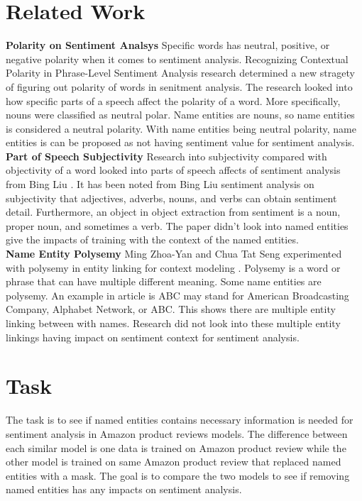 \documentclass[11pt,a4paper]{article}
\begin{document}
\section{Related Work}

\noindent \textbf{Polarity on Sentiment Analsys} Specific words has neutral, positive, or negative polarity when it comes to sentiment analysis. Recognizing Contextual Polarity in Phrase-Level Sentiment Analysis research determined a new stragety of figuring out polarity of words in senitment analysis. The research looked into how specific parts of a speech affect the polarity of a word. More specifically, nouns were classified as neutral polar. Name entities are nouns, so name entities is considered a neutral polarity. With name entities being neutral polarity, name entities is can be proposed as not having sentiment value for sentiment analysis. \\

\noindent \textbf{Part of Speech Subjectivity} Research into subjectivity compared with objectivity of a word looked into parts of speech affects of sentiment analysis from Bing Liu \cite{subject}. It has been noted from Bing Liu sentiment analysis on subjectivity that adjectives, adverbs, nouns, and verbs can obtain sentiment detail. Furthermore, an object in object extraction from sentiment is a noun, proper noun, and sometimes a verb. The paper didn't look into named entities give the impacts of training with the context of the named entities. \\

\noindent \textbf{Name Entity Polysemy} Ming Zhoa-Yan and Chua Tat Seng experimented with polysemy in entity linking for context modeling \cite{MING201518}. Polysemy is a word or phrase that can have multiple different meaning. Some name entities are polysemy. An example in article is ABC may stand for American Broadcasting Company, Alphabet Network, or ABC. This shows there are multiple entity linking between with names. Research did not look into these multiple entity linkings having impact on sentiment context for sentiment analysis.

\section{Task}

The task is to see if named entities contains necessary information is needed for sentiment analysis in Amazon product reviews models. The difference between each similar model is one data is trained on Amazon product review while the other model is trained on same Amazon product review that replaced named entities with a mask. The goal is to compare the two models to see if removing named entities has any impacts on sentiment analysis.
\end{document}
